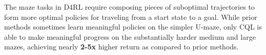 The maze tasks in D4RL require composing pieces of suboptimal trajectories to form more optimal policies for traveling from a start state to a goal. 
While prior methods sometimes learn meaningful policies on the simpler U-maze, only CQL is able to make meaningful progress on the substantially harder medium and large mazes, achieving nearly \textbf{2-5x} higher return as compared to prior methods.
